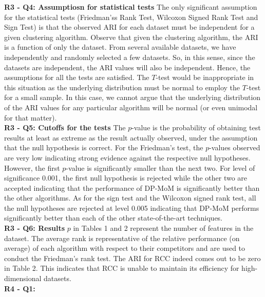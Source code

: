 \documentclass{article}
\begin{document}
\textbf{R3 - Q4: Assumptiosn for statistical tests} The only significant assumption for the statistical tests (Friedman'ss Rank Test, Wilcoxon Signed Rank Test and Sign Test) is that the observed ARI for each dataset must be independent for a given clustering algorithm. Observe that given the clustering algorithm, the ARI is a function of only the dataset. From several available datasets, we have independently and randomly selected a few datasets. So, in this sense, since the datasets are independent, the ARI values will also be independent. Hence, the assumptions for all the tests are satisfied. The $T$-test would be inappropriate in this situation as the underlying distribution must be normal to employ the $T$-test for a small sample. In this case, we cannot argue that the underlying distribution of the ARI values for any particular algorithm will be normal (or even unimodal for that matter).\\
\textbf{R3 - Q5: Cutoffs for the tests} The $p$-value is the probability of obtaining test results at least as extreme as the result actually observed, under the assumption that the null hypothesis is correct. For the Friedman's test, the $p$-values observed are very low indicating strong evidence against the respective null hypotheses. However, the first $p$-value is significantly smaller than the next two. For level of significance 0.001, the first null hypothesis is rejected while the other two are accepted indicating that the performance of DP-MoM is significantly better than the other algorithms. As for the sign test and the Wilcoxon signed rank test, all the null hypotheses are rejected at level 0.005 indicating that DP-MoM performs significantly better than each of the other state-of-the-art techniques.\\
\textbf{R3 - Q6: Results} $p$ in Tables 1 and 2 represent the number of features in the dataset. The average rank is representative of the relative performance (on average) of each algorithm with respect to their competitors and are used to conduct the Friedman's rank test. The ARI for RCC indeed comes out to be zero in Table 2. This indicates that RCC is unable to maintain its efficiency for high-dimensional datasets.\\
\textbf{R4 - Q1: } 
\end{document}
